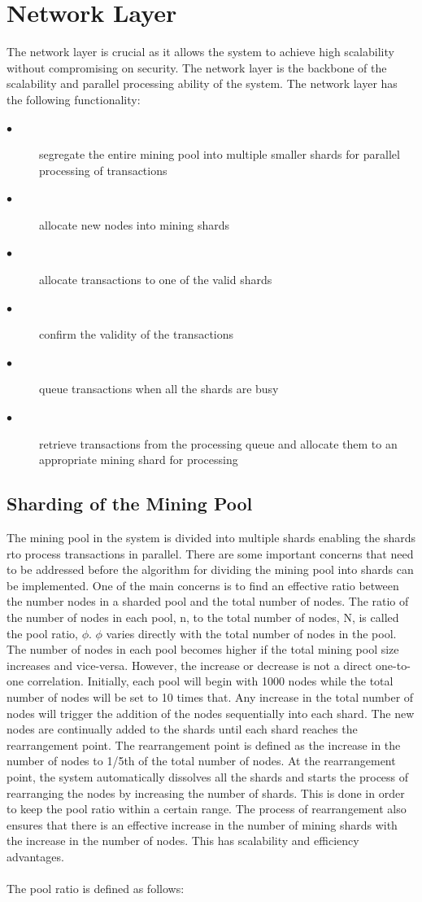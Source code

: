 \documentclass[a4paper,twoside,phd]{BYUPhys}
\begin{document}
\section{Network Layer}
The network layer is crucial as it allows the system to achieve high scalability without compromising on security. The network layer is the backbone of the scalability and parallel processing ability of the system. The network layer has the following functionality:
\begin{description}
\item[$\bullet$] segregate the entire mining pool into multiple smaller shards for parallel processing of transactions
\item[$\bullet$] allocate new nodes into mining shards
\item[$\bullet$] allocate transactions to one of the valid shards
\item[$\bullet$] confirm the validity of the transactions 
\item[$\bullet$] queue transactions when all the shards are busy
\item[$\bullet$] retrieve transactions from the processing queue and allocate them to an appropriate mining shard for processing
\end{description}
\subsection{Sharding of the Mining Pool}
The mining pool in the system is divided into multiple shards enabling the shards rto process transactions in parallel. There are some important concerns that need to be addressed before the algorithm for dividing the mining pool into shards can be implemented. One of the main concerns is to find an effective ratio between the number nodes in a sharded pool and the total number of nodes. The ratio of the number of nodes in each pool, n, to the total number of nodes, N, is called the pool ratio, $\phi$. $\phi$ varies directly with the total number of nodes in the pool. The number of nodes in each pool becomes higher if the total mining pool size increases and vice-versa. However, the increase or decrease is not a direct one-to-one correlation. Initially, each pool will begin with 1000 nodes while the total number of nodes will be set to 10 times that. Any increase in the total number of nodes will trigger the addition of the nodes sequentially into each shard. The new nodes are continually added to the shards until each shard reaches the rearrangement point. The rearrangement point is defined as the increase in the number of nodes to 1/5th of the total number of nodes. At the rearrangement point, the system automatically dissolves all the shards and starts the process of rearranging the nodes by increasing the number of shards. This is done in order to keep the pool ratio within a certain range. The process of rearrangement also ensures that there is an effective increase in the number of mining shards with the increase in the number of nodes. This has scalability and efficiency advantages.
\\
\\
The pool ratio is defined as follows:
\end{document}
